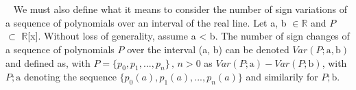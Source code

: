 \documentclass[a4paper]{article}
\begin{document}
\\~
\\~
We must also define what it means to consider the number of sign variations of a sequence of polynomials over an interval of the real line. Let a, b $\in \mathbb{R}$ and $P$ $\subset$ $\mathbb{R}$[x]. Without loss of generality, assume a < b. The number of sign changes of a sequence of polynomials $P$ over the interval (a, b) can be denoted $Var(P;\text{a},\text{b})$ and defined as, with $P = \{p_0, p_1, ... , p_n\}\, , \, n > 0$ as $Var(P;\text{a})-Var(P;\text{b})$, with $P;\text{a}$ denoting the sequence $\{p_0(a), p_1(a), ... , p_n(a)\}$ and similarily for $P;\text{b}$.
\end{document}
